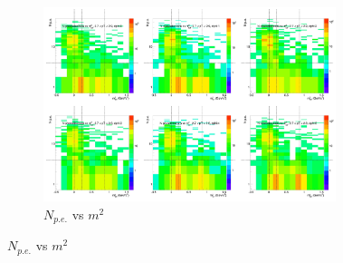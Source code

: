 \begin{figure}[H]
  \centering
    \begin{subfigure}{1\textwidth}
   \centering
   \includegraphics[width=0.94\textwidth]{hiptfits/neg/PSaccthreshold_cent0_ich0_accfire0_ptbin11.jpg}
    \caption{$N_{p.e.}$ vs $m^2$}
    \end{subfigure}
\end{figure}
